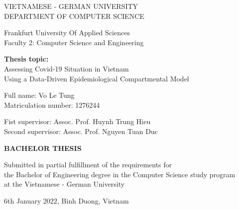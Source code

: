 \documentclass[a4paper,11pt]{report}
\begin{document}

\begin{titlepage}
    \begin{center}
        \LARGE

        VIETNAMESE - GERMAN UNIVERSITY\\
        DEPARTMENT OF COMPUTER SCIENCE

        \vspace*{0.5cm}

        Frankfurt University Of Applied Sciences\\
        Faculty 2: Computer Science and Engineering

        \vspace*{2cm}

        \Large

        \textbf{Thesis topic:}\\
        Assessing Covid-19 Situation in Vietnam\\
        Using a Data-Driven Epidemiological Compartmental Model

        \vspace*{2cm}

        \large

        Full name: Vo Le Tung\\
        Matriculation number: 1276244

        \vspace*{0.5cm}

        Fist supervisor: Assoc. Prof. Huynh Trung Hieu\\
        Second supervisor: Assoc. Prof. Nguyen Tuan Duc

        \vspace*{2cm}

        \LARGE
        \textbf{BACHELOR THESIS}

        \vspace*{2cm}

        \large
        Submitted in partial fulfillment of the requirements for\\
        the Bachelor of Engineering degree in the Computer Science study program\\
        at the Vietnamese - German University

        \vfill

        6th January 2022, Binh Duong, Vietnam
    \end{center}
\end{titlepage}
\end{document}
